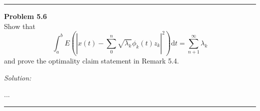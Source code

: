 \documentclass[a4paper, 11pt]{article}
\newenvironment{problem}[2][Problem]
    { \begin{mdframed}[backgroundcolor=gray!20] \textbf{#1 #2} \\}
    {  \end{mdframed}}
\newenvironment{solution}
    {\textit{Solution:}}
    {}
\begin{document}
\noindent\rule{7in}{2.8pt}



\begin{problem}{5.6}
Show that
\[
\int_{a}^{b} E\left(\left|x(t)-\sum_{0}^{n} \sqrt{\lambda_{k}} \phi_{k}(t) z_{k}\right|^{2}\right) \mathrm{d} t=\sum_{n+1}^{\infty} \lambda_{k}
\]
and prove the optimality claim statement in Remark 5.4.
\end{problem}
\begin{solution}
	
	...
	
\end{solution} 

\noindent\rule{7in}{2.8pt}
\end{document}
